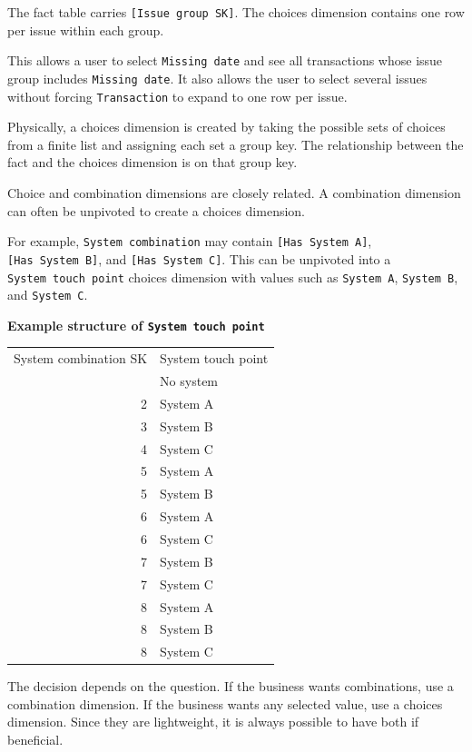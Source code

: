 \documentclass[10pt,openany,10pt]{book}
\newcounter{none}
\let\podeToprule\toprule
\let\podeMidrule\midrule
\let\podeBottomrule\bottomrule
\renewcommand{\toprule}{\arrayrulecolor{pbiGrid}\podeToprule}
\renewcommand{\midrule}{\arrayrulecolor{pbiGrid}\podeMidrule}
\renewcommand{\bottomrule}{\arrayrulecolor{pbiGrid}\podeBottomrule}
\begin{document}
The fact table carries \texttt{{[}Issue\ group\ SK{]}}. The choices
dimension contains one row per issue within each group.

This allows a user to select \texttt{Missing\ date} and see all
transactions whose issue group includes \texttt{Missing\ date}. It also
allows the user to select several issues without forcing
\texttt{\textquotesingle{}Transaction\textquotesingle{}} to expand to
one row per issue.

Physically, a choices dimension is created by taking the possible sets
of choices from a finite list and assigning each set a group key. The
relationship between the fact and the choices dimension is on that group
key.

Choice and combination dimensions are closely related. A combination
dimension can often be unpivoted to create a choices dimension.

For example,
\texttt{\textquotesingle{}System\ combination\textquotesingle{}} may
contain \texttt{{[}Has\ System\ A{]}}, \texttt{{[}Has\ System\ B{]}},
and \texttt{{[}Has\ System\ C{]}}. This can be unpivoted into a
\texttt{\textquotesingle{}System\ touch\ point\textquotesingle{}}
choices dimension with values such as \texttt{System\ A},
\texttt{System\ B}, and \texttt{System\ C}.

\textbf{Example structure of
\texttt{\textquotesingle{}System\ touch\ point\textquotesingle{}}}

{\def\LTcaptype{none} %
\begin{longtable}[]{@{}rl@{}}
\toprule\noalign{}
System combination SK & System touch point \\
\midrule\noalign{}
\endhead
\bottomrule\noalign{}
\endlastfoot
1 & No system \\
2 & System A \\
3 & System B \\
4 & System C \\
5 & System A \\
5 & System B \\
6 & System A \\
6 & System C \\
7 & System B \\
7 & System C \\
8 & System A \\
8 & System B \\
8 & System C \\
\end{longtable}
}

The decision depends on the question. If the business wants
combinations, use a combination dimension. If the business wants any
selected value, use a choices dimension. Since they are lightweight, it
is always possible to have both if beneficial.
\end{document}

